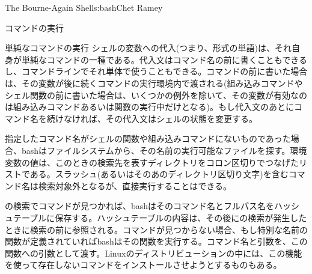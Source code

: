 \begin{aosachapter}{The Bourne-Again Shell}{s:bash}{Chet Ramey}
\begin{aosasect1}{コマンドの実行}
\begin{aosasect2}{単純なコマンドの実行}
シェルの変数への代入(つまり、形式の単語)は、それ自身が単純なコマンドの一種である。代入文はコマンド名の前に書くこともできるし、コマンドラインでそれ単体で使うこともできる。コマンドの前に書いた場合は、その変数が後に続くコマンドの実行環境内で渡される(組み込みコマンドやシェル関数の前に書いた場合は、いくつかの例外を除いて、その変数が有効なのは組み込みコマンドあるいは関数の実行中だけとなる)。もし代入文のあとにコマンド名を続けなければ、その代入文はシェルの状態を変更する。

指定したコマンド名がシェルの関数や組み込みコマンドにないものであった場合、bashはファイルシステムから、その名前の実行可能なファイルを探す。環境変数の値は、このときの検索先を表すディレクトリをコロン区切りでつなげたリストである。スラッシュ(あるいはそのあのディレクトリ区切り文字)を含むコマンド名は検索対象外となるが、直接実行することはできる。

の検索でコマンドが見つかれば、bashはそのコマンド名とフルパス名をハッシュテーブルに保存する。ハッシュテーブルの内容は、その後にの検索が発生したときに検索の前に参照される。コマンドが見つからない場合、もし特別な名前の関数が定義されていればbashはその関数を実行する。コマンド名と引数を、この関数への引数として渡す。Linuxのディストリビューションの中には、この機能を使って存在しないコマンドをインストールさせようとするものもある。


\end{aosasect2}
\end{aosasect1}
\end{aosachapter}

